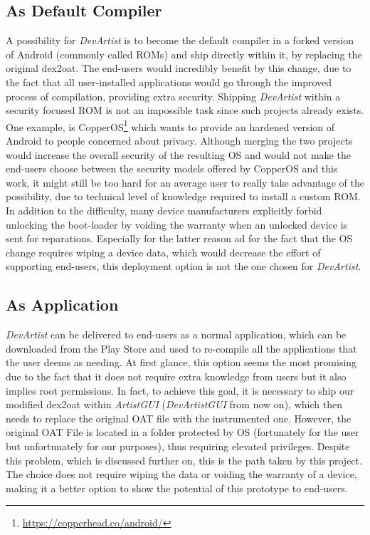 \subsection{As Default Compiler}
\label{sc:deploy}
A possibility for \emph{DevArtist} is to become the default compiler in a forked version of Android (commonly called ROMs) and ship directly within it, by replacing the original dex2oat. The end-users would incredibly benefit by this change, due to the fact that all user-installed applications would go through the improved process of compilation, providing extra security. Shipping \emph{DevArtist} within a security focused ROM is not an impossible task since such projects already exists. One example, is CopperOS\footnote{\url{https://copperhead.co/android/}} which wants to provide an hardened version of Android to people concerned about privacy. Although merging the two projects would increase the overall security of the resulting OS and would not make the end-users choose between the security models offered by CopperOS and this work, it might still be too hard for an average user to really take advantage of the possibility, due to technical level of knowledge required to install a custom ROM. In addition to the difficulty, many device manufacturers explicitly forbid unlocking the boot-loader by voiding the warranty when an unlocked device is sent for reparations. Especially for the latter reason ad for the fact that the OS change requires wiping a device data, which would decrease the effort of supporting end-users, this deployment option is not the one chosen for \emph{DevArtist}.

\subsection{As Application}
\emph{DevArtist} can be delivered to end-users as a normal application, which can be downloaded from the Play Store and used to re-compile all the applications that the user deems as needing. At first glance, this option seems the most promising due to the fact that it does not require extra knowledge from users but it also implies root permissions. In fact, to achieve this goal, it is necessary to ship our modified dex2oat within \emph{ArtistGUI} (\emph{DevArtistGUI} from now on), which then needs to replace the original OAT file with the instrumented one. However, the original OAT File is located in a folder protected by OS (fortunately for the user but unfortunately for our purposes), thus requiring elevated privileges. Despite this problem, which is discussed further on, this is the path taken by this project. The choice does not require wiping the data or voiding the warranty of a device, making it a better option to show the potential of this prototype to end-users.

